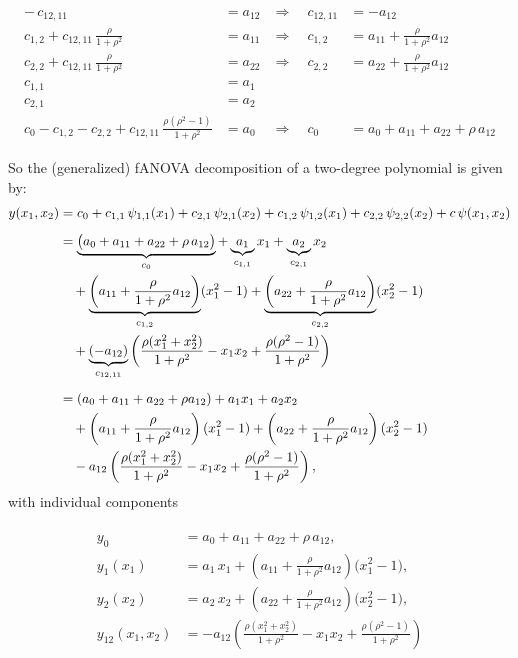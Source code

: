 \begin{align*}
-\,c_{12, 11} &= a_{12} &\Rightarrow\quad c_{12, 11} &= -a_{12} \\[3pt]
c_{1,2} + c_{12, 11}\,\tfrac{\rho}{1+\rho^2} &= a_{11} 
&\Rightarrow\quad c_{1,2} &= a_{11} + \tfrac{\rho}{1+\rho^2}a_{12} \\[3pt]
c_{2,2} + c_{12, 11}\,\tfrac{\rho}{1+\rho^2} &= a_{22} 
&\Rightarrow\quad c_{2,2} &= a_{22} + \tfrac{\rho}{1+\rho^2}a_{12} \\[3pt]
c_{1,1} &= a_1 \\[3pt]
c_{2,1} &= a_2 \\[3pt]
c_0 - c_{1,2} - c_{2,2} + c_{12, 11}\,\tfrac{\rho(\rho^2 - 1)}{1+\rho^2} &= a_0 
&\Rightarrow\quad 
c_0 &= a_0 + a_{11} + a_{22} + \rho\,a_{12}
\end{align*}

So the (generalized) fANOVA decomposition of a two-degree polynomial is given by:
\begin{align*}
y(x_1,x_2) 
&= c_0 
  + c_{1,1}\,\psi_{1,1}(x_1) 
  + c_{2,1}\,\psi_{2,1}(x_2)
  + c_{1,2}\,\psi_{1,2}(x_1)
  + c_{2,2}\,\psi_{2,2}(x_2)
  + c\,\psi(x_1,x_2) \\[5pt]
&= 
\underbrace{\big(a_0 + a_{11} + a_{22} + \rho\,a_{12}\big)}_{c_0} 
+ \underbrace{a_1}_{c_{1,1}} x_1
+ \underbrace{a_2}_{c_{2,1}} x_2 \\ 
&\quad 
+ \underbrace{\left(a_{11} + \frac{\rho}{1+\rho^2}a_{12}\right)}_{c_{1,2}} (x_1^2 - 1)
+ \underbrace{\left(a_{22} + \frac{\rho}{1+\rho^2}a_{12}\right)}_{c_{2,2}} (x_2^2 - 1) \notag \\
&\quad 
+ \underbrace{(-a_{12})}_{c_{12, 11}}\left(
    \frac{\rho(x_1^2+x_2^2)}{1+\rho^2} - x_1 x_2 
    + \frac{\rho(\rho^2-1)}{1+\rho^2}
  \right) \\[5pt]
&= 
(a_0 + a_{11} + a_{22} + \rho a_{12})
+ a_1 x_1
+ a_2 x_2 \notag \\ 
&\quad 
+ \left(a_{11} + \frac{\rho}{1+\rho^2} a_{12}\right)(x_1^2 - 1)
+ \left(a_{22} + \frac{\rho}{1+\rho^2} a_{12}\right)(x_2^2 - 1) \notag \\
&\quad 
- a_{12}\left(
  \frac{\rho(x_1^2 + x_2^2)}{1+\rho^2}
  - x_1 x_2
  + \frac{\rho(\rho^2 - 1)}{1+\rho^2}
  \right),
\end{align*}
with individual components

\begin{align}
\begin{split}
y_0 &= a_0 + a_{11} + a_{22} + \rho\,a_{12}, \\[3pt]
y_1(x_1) &= a_1\,x_1 
  + \left(a_{11} + \frac{\rho}{1+\rho^2}a_{12}\right)\bigl(x_1^2 - 1\bigr), \\[3pt]
y_2(x_2) &= a_2\,x_2 
  + \left(a_{22} + \frac{\rho}{1+\rho^2}a_{12}\right)\bigl(x_2^2 - 1\bigr), \\[3pt]
y_{12}(x_1,x_2) 
&= -a_{12}\!\left(
    \frac{\rho(x_1^2+x_2^2)}{1+\rho^2} 
    - x_1 x_2 
    + \frac{\rho(\rho^2-1)}{1+\rho^2}
   \right)
\end{split}
\label{eq:fanova_components_2D_polynomial}
\end{align}



